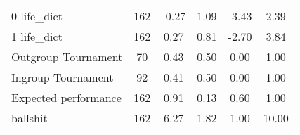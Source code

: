 {\begin{tabular}{l*{1}{ccccc}}
0 life\_dict         &         162&       -0.27&        1.09&       -3.43&        2.39\\
1 life\_dict         &         162&        0.27&        0.81&       -2.70&        3.84\\
Outgroup Tournament &          70&        0.43&        0.50&        0.00&        1.00\\
Ingroup Tournament  &          92&        0.41&        0.50&        0.00&        1.00\\
Expected performance&         162&        0.91&        0.13&        0.60&        1.00\\
ballshit            &         162&        6.27&        1.82&        1.00&       10.00\\
\hline\hline
\end{tabular}
}

